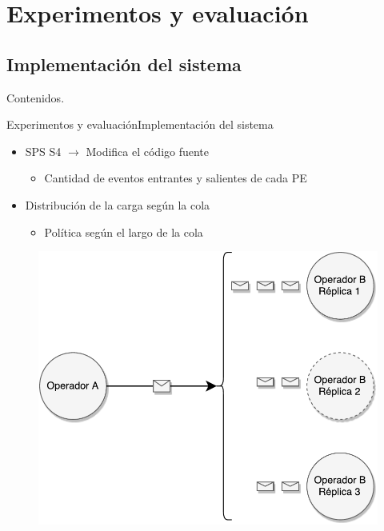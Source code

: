 \section{Experimentos y evaluación}
\subsection*{Implementación del sistema}

\addtocounter{framenumber}{-1}
\begin{frame}[t]{Contenidos}{\textcolor{UniBlue}{.}}
	\tableofcontents[currentsection]
\end{frame}

\begin{frame}{Experimentos y evaluación}{Implementación del sistema}
\begin{itemize}
\item SPS S4 $\rightarrow$ Modifica el código fuente
	\begin{itemize}
		\item Cantidad de eventos entrantes y salientes de cada PE
	\end{itemize}
\item Distribución de la carga según la cola
	\begin{itemize}
		\item Política según el largo de la cola
	\end{itemize}
\end{itemize}

\begin{figure}
  \center
    \includegraphics[scale=0.35]{images/DistribucionCarga-I.pdf}
\end{figure}
\end{frame}

